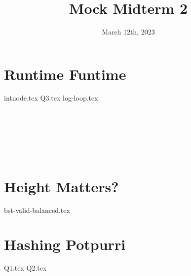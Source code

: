 \documentclass[11pt]{exam}
\title{Mock Midterm 2}
\date{March 12th, 2023}
\begin{document}
\maketitle


\section{Runtime Funtime}

\begin{questions}
{intnode.tex}
{Q3.tex}
{log-loop.tex}

\end{questions}


\\
\\
\\
\\
\\
\clearpage


\clearpage


\section{Height Matters?}

\begin{questions}
{bst-valid-balanced.tex} 
\end{questions}

\clearpage



\section{Hashing Potpurri}

\begin{questions}
{Q1.tex}
\clearpage
{Q2.tex}
\end{questions}

\clearpage


\end{document}

